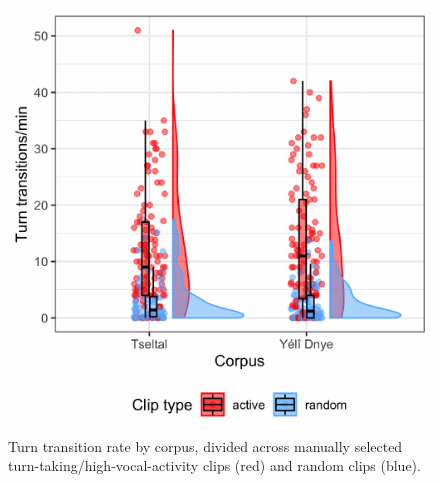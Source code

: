 \documentclass[10pt, letterpaper]{article}
\newenvironment{CodeChunk}{}{}
\begin{document}
\begin{CodeChunk}
\begin{figure}[h]

{\centering \includegraphics{figs/tseyel.ttr.fig-1} 

}

\caption[Turn transition rate by corpus, divided across manually selected turn-taking/high-vocal-activity clips (red) and random clips (blue)]{Turn transition rate by corpus, divided across manually selected turn-taking/high-vocal-activity clips (red) and random clips (blue).}\label{fig:tseyel.ttr.fig}
\end{figure}
\end{CodeChunk}
\end{document}
